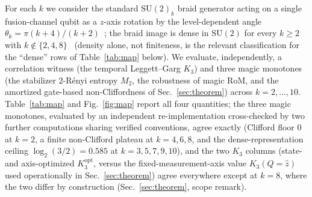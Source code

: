 \documentclass[aps,pra,twocolumn,superscriptaddress,longbibliography,floatfix,nofootinbib]{revtex4-2}
\begin{document}
For each $k$ we consider the standard $\mathrm{SU}(2)_k$ braid
generator acting on a single fusion-channel qubit as a $z$-axis
rotation by the level-dependent angle
$\theta_k=\pi(k+4)/(k+2)$~\cite{FreedmanLarsenWang2002,%
FreedmanLarsenWang2003}; the braid image is dense in
$\mathrm{SU}(2)$ for every $k\ge2$ with $k\notin\{2,4,8\}$~\cite{Kuperberg2011}
(density alone, not finiteness, is the relevant classification for
the ``dense'' rows of Table~\ref{tab:map} below). We evaluate,
independently, a correlation
witness (the temporal Leggett--Garg $K_3$) and three magic monotones
(the stabilizer $2$-Rényi entropy $M_2$, the robustness of magic RoM,
and the amortized gate-based non-Cliffordness of
Sec.~\ref{sec:theorem}) across $k=2,\ldots,10$. Table~\ref{tab:map}
and Fig.~\ref{fig:map} report all four quantities; the three magic
monotones, evaluated by an independent re-implementation cross-checked
by two further computations sharing verified conventions, agree
exactly (Clifford floor $0$ at $k=2$, a finite non-Clifford
plateau at $k=4,6,8$, and the dense-representation ceiling
$\log_2(3/2)=0.585$ at $k=3,5,7,9,10$), and the two $K_3$ columns
(state- and axis-optimized $K_3^{\mathrm{opt}}$, versus the
fixed-measurement-axis value $K_3(Q{=}\hat z)$ used operationally in
Sec.~\ref{sec:theorem}) agree everywhere except at $k=8$, where the
two differ by construction (Sec.~\ref{sec:theorem}, scope remark).
\end{document}
